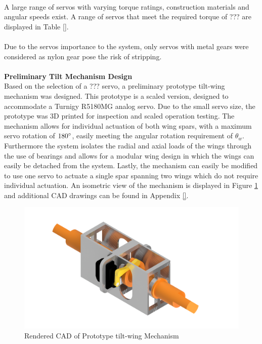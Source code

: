 \\
A large range of servos with varying torque ratings, construction materials and angular speeds exist. A range of servos that meet the required torque of ??? are displayed in Table \ref{}. \\
\\
Due to the servos importance to the system, only servos with metal gears were considered as nylon gear pose the risk of stripping.\\
\\
\textbf{Preliminary Tilt Mechanism Design}\\
Based on the selection of a ??? servo, a preliminary prototype tilt-wing mechanism was designed. This prototype is a scaled version, designed to accommodate a Turnigy R5180MG analog servo. Due to the small servo size, the prototype was 3D printed for inspection and scaled operation testing. The mechanism allows for individual actuation of both wing spars, with a maximum servo rotation of \(180\degree\), easily meeting the angular rotation requirement of \(\theta_w\). Furthermore the system isolates the radial and axial loads of the wings through the use of bearings and allows for a modular wing design in which the wings can easily be detached from the system. Lastly, the mechanism can easily be modified to use one servo to actuate a single spar spanning two wings which do not require individual actuation. An isometric view of the mechanism is displayed in Figure \ref{fig:render} and additional CAD drawings can be found in Appendix \ref{}.
\begin{figure}[H]
    \centering
    \includegraphics[width = \textwidth]{Tiltwing/Tilt Assembly Render.png}
    \caption{Rendered CAD of Prototype tilt-wing Mechanism}
    \label{fig:render}
\end{figure}

